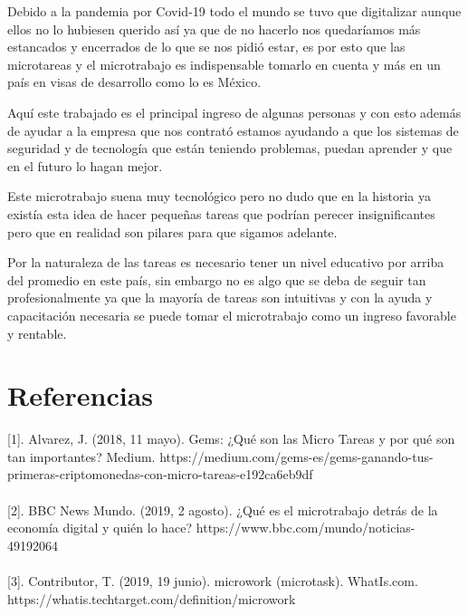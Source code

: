 \documentclass[12pt]{proc}
\begin{document}
Debido a la pandemia por Covid-19 todo el mundo se tuvo que digitalizar aunque ellos no lo hubiesen querido así ya que de no hacerlo nos quedaríamos más estancados y encerrados de lo que se nos pidió estar, es por esto que las microtareas y el microtrabajo es indispensable tomarlo en cuenta y más en un país en visas de desarrollo como lo es México. 

Aquí este trabajado es el principal ingreso de algunas personas y con esto además de ayudar a la empresa que nos contrató estamos ayudando a que los sistemas de seguridad y de tecnología que están teniendo problemas, puedan aprender y que en el futuro lo hagan mejor.

Este microtrabajo suena muy tecnológico pero no dudo que en la historia ya existía esta idea de hacer pequeñas tareas que podrían perecer insignificantes pero que en realidad son pilares para que sigamos adelante. 

Por la naturaleza de las tareas es necesario tener un nivel educativo por arriba del promedio en este país, sin embargo no es algo que se deba de seguir tan profesionalmente ya que la mayoría de tareas son intuitivas y con la ayuda y capacitación necesaria se puede tomar el microtrabajo como un ingreso favorable y rentable.
\section{Referencias}
[1]. Alvarez, J. (2018, 11 mayo). Gems: ¿Qué son las Micro Tareas y por qué son tan importantes? Medium. https://medium.com/gems-es/gems-ganando-tus-primeras-criptomonedas-con-micro-tareas-e192ca6eb9df \\\\

[2]. BBC News Mundo. (2019, 2 agosto). ¿Qué es el microtrabajo detrás de la economía digital y quién lo hace? https://www.bbc.com/mundo/noticias-49192064 \\\\

[3]. Contributor, T. (2019, 19 junio). microwork (microtask). WhatIs.com. https://whatis.techtarget.com/definition/microwork \\\\
\end{document}
